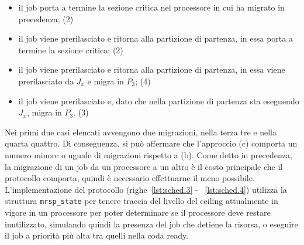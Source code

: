 \begin{itemize}
\item il job porta a termine la sezione critica nel processore in cui ha migrato in precedenza; (2)
\item il job viene prerilasciato e ritorna alla partizione di partenza, in essa porta a termine la sezione critica; (2)
\item il job viene prerilasciato e ritorna alla partizione di partenza, in essa viene prerilasciato da $J_x$ e migra in $P_3$; (4)
\item il job viene prerilasciato e, dato che nella partizione di partenza sta eseguendo $J_x$, migra in $P_3$. (3)
\end{itemize}

Nei primi due casi elencati avvengono due migrazioni, nella terza tre e nella quarta quattro. Di conseguenza, si può affermare che l'approccio (c) comporta un numero minore o uguale di migrazioni rispetto a (b). Come detto in precedenza, la migrazione di un job da un processore a un altro è il costo principale che il protocollo comporta, quindi è necessario effettuarne il meno possibile.\\

L'implementazione del protocollo (righe~\ref{lst:sched.3} - ~\ref{lst:sched.4}) utilizza la struttura \texttt{mrsp\_state} per tenere traccia del livello del ceiling attualmente in vigore in un processore per poter determinare se il processore deve restare inutilizzato, simulando quindi la presenza del job che detiene la risorsa, o eseguire il job a priorità più alta tra quelli nella coda ready.\\

